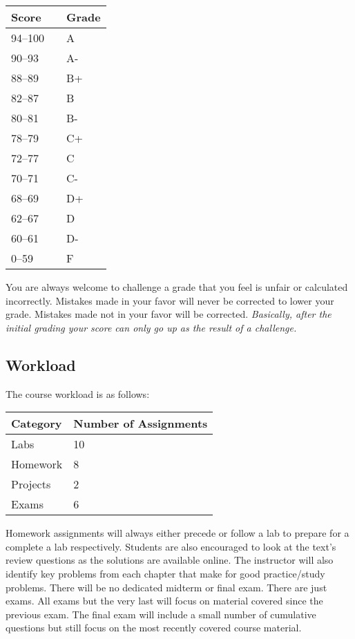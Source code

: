 \documentclass[10pt]{article}
\begin{document}
\begin{center}
\begin{small}
\begin{tabular}{lcl}
Score & & Grade \\ \toprule
94--100 & & A \\
90--93 & & A- \\
88--89 & & B+ \\
82--87 & & B \\
80--81 & & B- \\
78--79 & & C+ \\
72--77 & & C \\
70--71 & & C- \\
68--69 & & D+ \\
62--67 & & D \\
60--61 & & D- \\
0--59 & & F
\end{tabular}
\end{small}
\end{center}


You are always welcome to challenge a grade that you feel is unfair or calculated incorrectly.  Mistakes made in your favor will never be corrected to lower your grade.  Mistakes made not in your favor will be corrected.  \textit{Basically, after the initial grading your score can only go up as the result of a challenge.}

\subsection{Workload}

The course workload is as follows:
\begin{center}
  \begin{tabular}{ll}
    Category & Number of Assignments \\ \toprule
    Labs & 10 \\
    Homework & 8 \\
    Projects & 2 \\
    Exams & 6
  \end{tabular}
\end{center}

Homework assignments will always either precede or follow a lab to prepare for a complete a lab respectively. Students are also encouraged to look at the text's review questions as the solutions are available online.  The instructor will also identify key problems from each chapter that make for good practice/study problems. There will be no dedicated midterm or final exam. There are just exams.  All exams but the very last will focus on material covered since the previous exam. The final exam will include a small number of cumulative questions but still focus on the most recently covered course material.
\end{document}
